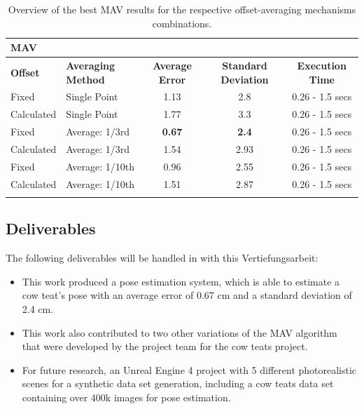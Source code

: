 \begin{longtable}{|l|l||c|c|c|}                                              \hline
\multicolumn{5}{|l|}{\textbf{MAV}}                                                       \\\hline
\textbf{Offset}         & \textbf{Averaging Method}   
& \textbf{Average Error}  & \textbf{Standard Deviation}  & \textbf{Execution Time}                 \\ \hline
Fixed                   & Single Point                & 1.13            & 2.8              & 0.26 - 1.5 secs   \\ \hline
Calculated              & Single Point                & 1.77            & 3.3              & 0.26 - 1.5 secs   \\ \hline
Fixed                   & Average: 1/3rd              & \textbf{0.67}   & \textbf{2.4}     & 0.26 - 1.5 secs                     \\ \hline
Calculated              & Average: 1/3rd              & 1.54            & 2.93             & 0.26 - 1.5 secs    \\ \hline
Fixed                   & Average: 1/10th             & 0.96            & 2.55             & 0.26 - 1.5 secs     \\ \hline
Calculated              & Average: 1/10th             & 1.51            & 2.87             & 0.26 - 1.5 secs    \\ \hline
\caption{Overview of the best MAV results for the respective offset-averaging mechanisms combinations.} \label{tab:mav-results}                          
\end{longtable}



\subsection{Deliverables}
The following deliverables will be handled in with this Vertiefungsarbeit:
\begin{itemize}
    \item This work produced a pose estimation system, which is able to estimate a cow teat's pose with an average error of 0.67 cm and a standard deviation of 2.4 cm. 
    \item This work also contributed to two other variations of the MAV algorithm that were developed by the project team for the cow teats project.
    \item For future research, an Unreal Engine 4 project with 5 different photorealistic scenes for a synthetic data set generation, including a cow teats data set containing over 400k images for pose estimation.
\end{itemize}